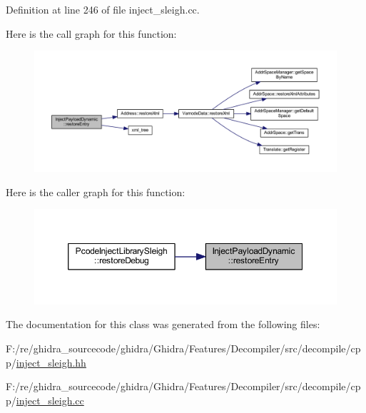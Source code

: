Definition at line 246 of file inject\+\_\+sleigh.\+cc.

Here is the call graph for this function\+:
\nopagebreak
\begin{figure}[H]
\begin{center}
\leavevmode
\includegraphics[width=350pt]{class_inject_payload_dynamic_a0cce9f9b5053cacbd52f4635a687bae2_cgraph}
\end{center}
\end{figure}
Here is the caller graph for this function\+:
\nopagebreak
\begin{figure}[H]
\begin{center}
\leavevmode
\includegraphics[width=350pt]{class_inject_payload_dynamic_a0cce9f9b5053cacbd52f4635a687bae2_icgraph}
\end{center}
\end{figure}


The documentation for this class was generated from the following files\+:\begin{DoxyCompactItemize}
\item 
F\+:/re/ghidra\+\_\+sourcecode/ghidra/\+Ghidra/\+Features/\+Decompiler/src/decompile/cpp/\mbox{\hyperlink{inject__sleigh_8hh}{inject\+\_\+sleigh.\+hh}}\item 
F\+:/re/ghidra\+\_\+sourcecode/ghidra/\+Ghidra/\+Features/\+Decompiler/src/decompile/cpp/\mbox{\hyperlink{inject__sleigh_8cc}{inject\+\_\+sleigh.\+cc}}\end{DoxyCompactItemize}
